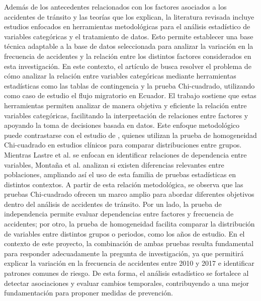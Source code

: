 \documentclass[12pt]{article}
\begin{document}
Además de los antecedentes relacionados con los factores asociados a los accidentes de tránsito y las teorías que los explican, la literatura revisada incluye estudios enfocados en herramientas metodológicas para el análisis estadístico de variables categóricas y el tratamiento de datos. Esto permite establecer una base técnica adaptable a la base de datos seleccionada para analizar la variación en la frecuencia de accidentes y la relación entre los distintos factores considerados en esta investigación. En este contexto, el artículo de \textcite{LASTRE2019} busca resolver el problema de cómo analizar la relación entre variables categóricas mediante herramientas estadísticas como las tablas de contingencia y la prueba Chi-cuadrado, utilizando como caso de estudio el flujo migratorio en Ecuador. El trabajo sostiene que estas herramientas permiten analizar de manera objetiva y eficiente la relación entre variables categóricas, facilitando la interpretación de relaciones entre factores y apoyando la toma de decisiones basada en datos. Este enfoque metodológico puede contrastarse con el estudio de \textcite{MONTANA2025}, quienes utilizan la prueba de homogeneidad Chi-cuadrado en estudios clínicos para comparar distribuciones entre grupos. Mientras Lastre et al. se enfocan en identificar relaciones de dependencia entre variables, Montaña et al. analizan si existen diferencias relevantes entre poblaciones, ampliando así el uso de esta familia de pruebas estadísticas en distintos contextos. A partir de esta relación metodológica, se observa que las pruebas Chi-cuadrado ofrecen un marco amplio para abordar diferentes objetivos dentro del análisis de accidentes de tránsito. Por un lado, la prueba de independencia permite evaluar dependencias entre factores y frecuencia de accidentes; por otro, la prueba de homogeneidad facilita comparar la distribución de variables entre distintos grupos o periodos, como los años de estudio. En el contexto de este proyecto, la combinación de ambas pruebas resulta fundamental para responder adecuadamente la pregunta de investigación, ya que permitirá explicar la variación en la frecuencia de accidentes entre 2010 y 2017 e identificar patrones comunes de riesgo. De esta forma, el análisis estadístico se fortalece al detectar asociaciones y evaluar cambios temporales, contribuyendo a una mejor fundamentación para proponer medidas de prevención.
\end{document}
